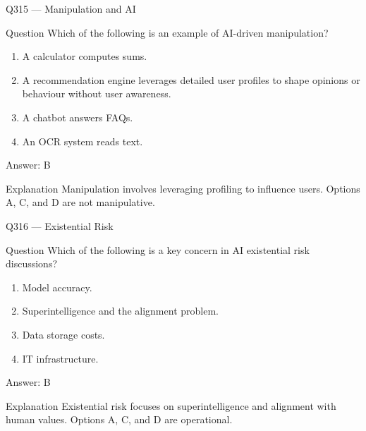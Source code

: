 \documentclass[aspectratio=169,8pt]{beamer}
\begin{document}
\begin{frame}{Q315 --- Manipulation and AI}
	\begin{block}{Question}
		Which of the following is an example of AI-driven manipulation?
		\begin{enumerate}
			\item A calculator computes sums.
			\item A recommendation engine leverages detailed user profiles to shape opinions or behaviour without user awareness.
			\item A chatbot answers FAQs.
			\item An OCR system reads text.
	\end{enumerate}  \end{block}
	\begin{exampleblock}{Answer: B}\end{exampleblock}
	\begin{block}{Explanation}
		Manipulation involves leveraging profiling to influence users. Options A, C, and D are not manipulative.
	\end{block}
\end{frame}

\begin{frame}{Q316 --- Existential Risk}
	\begin{block}{Question}
		Which of the following is a key concern in AI existential risk discussions?
		\begin{enumerate}
			\item Model accuracy.
			\item Superintelligence and the alignment problem.
			\item Data storage costs.
			\item IT infrastructure.
	\end{enumerate}  \end{block}
	\begin{exampleblock}{Answer: B}\end{exampleblock}
	\begin{block}{Explanation}
		Existential risk focuses on superintelligence and alignment with human values. Options A, C, and D are operational.
	\end{block}
\end{frame}
\end{document}
